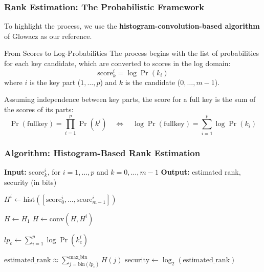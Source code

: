 \begin{frame}
    \frametitle{Rank Estimation: The Probabilistic Framework}

    To highlight the process, we use the \textbf{histogram-convolution-based algorithm} of Glowacz as our reference.

    \begin{block}{From Scores to Log-Probabilities}
        The process begins with the list of probabilities for each key candidate, which are converted to scores in the log domain:
        \[
            \text{score}_k^i = \log \Pr(k_i)
        \]
        where $i$ is the key part ($1, \dots, p$) and $k$ is the candidate ($0, \dots, m-1$).
        
        Assuming independence between key parts, the score for a full key is the sum of the scores of its parts:
        \[
             \Pr(\text{fullkey}) = \prod_{i=1}^{p}\Pr(k^i) \quad \iff \quad \log \Pr(\text{fullkey}) = \sum_{i=1}^{p} \log \Pr(k_i)
        \]
    \end{block}
\end{frame}

\begin{frame}
    \frametitle{Algorithm: Histogram-Based Rank Estimation}
    
    \begin{algorithm}[H]
    \begin{algorithmic}[] 
        \Statex \textbf{Input:} $\text{score}_k^i$, for $i=1, \dots, p$ and $k=0, \dots, m-1$
        \Statex \textbf{Output:} estimated rank, security (in bits)
        
            \State $H^i \gets \text{hist}([\text{score}_0^i, \dots, \text{score}_{m-1}^i])$
        \EndFor
        
        \State $H \gets H_1$
            \State $H \gets \text{conv}(H, H^i)$ 
        \EndFor
        
        \State $lp_c \gets \sum_{i=1}^{p} \log \Pr(k_c^i)$
        
        \State $\text{estimated\_rank} \approx \sum_{j=\text{bin}(lp_c)}^{\text{max\_bin}} H(j)$
        \State $\text{security} \gets \log_2(\text{estimated\_rank})$
    \end{algorithmic}
    \end{algorithm}
\end{frame}



